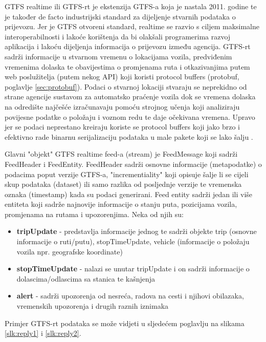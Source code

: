 \documentclass[zavrsnirad]{fer}
\begin{document}
GTFS realtime ili GTFS-rt je ekstenzija GTFS-a koja je nastala 2011. godine te je također de facto
industrijski standard za dijeljenje stvarnih podataka o prijevozu. Jer je GTFS otvoreni standard,
realtime se razvio s ciljem maksimalne interoperabilnosti i lakoće korištenja da bi olakšali
programerima razvoj aplikacija i lakoću dijeljenja informacija o prijevozu između agencija. GTFS-rt
sadrži informacije u stvarnom vremenu o lokacijama vozila, predviđenim vremenima dolaska te
obavijestima o promjenama ruta i otkazivanjima putem web poslužitelja (putem nekog API) koji koristi protocol buffers (protobuf, poglavlje \ref{sec:protobuf}). Podaci o stvarnoj lokaciji stvaraju se neprekidno od strane agencije sustavom za automatsko praćenje vozila dok se vremena dolaska na odredište najčešće izračunavaju pomoću strojnog učenja koji analiziraju povijesne podatke o položaju i voznom redu te daje očekivana vremena. Upravo jer se podaci neprestano kreiraju koriste se protocol buffers koji jako brzo i efektivno rade binarnu serijalizaciju podataka u male pakete koji se lako šalju \cite{GTFS-realtime}.

Glavni "objekt" GTFS realtime feed-a (stream) je FeedMessage koji sadrži FeedHeader i FeedEntity.
FeedHeader sadrži osnovne informacije (metapodatke) o podacima poput verzije GTFS-a, "incrementiality" koji opisuje šalje li se cijeli skup podataka (dataset) ili samo razlika od posljednje verzije te vremenska oznaka (timestamp) kada su podaci generirani.
Feed entity sadrži jedan ili više entiteta koji sadrže najnovije informacije o stanju puta, pozicijama vozila, promjenama na rutama i upozorenjima. Neka od njih su: 

\begin{itemize}
	\item \textbf{tripUpdate} - predstavlja informacije jednog te sadrži objekte trip (osnovne informacije o ruti/putu), stopTimeUpdate, vehicle (informacije o položaju vozila npr. geografske koordinate)
	\item \textbf{stopTimeUpdate} - nalazi se unutar tripUpdate i on sadrži informacije o dolascima/odlascima sa stanica te kašnjenja
	\item \textbf{alert} - sadrži upozorenja od nesreća, radova na cesti i njihovi obilazaka, vremenskih upozorenja i drugih raznih iznimaka
\end{itemize}

Primjer GTFS-rt podataka se može vidjeti u sljedećem poglavlju na slikama \ref{slk:reply1} i \ref{slk:reply2}.
\end{document}
